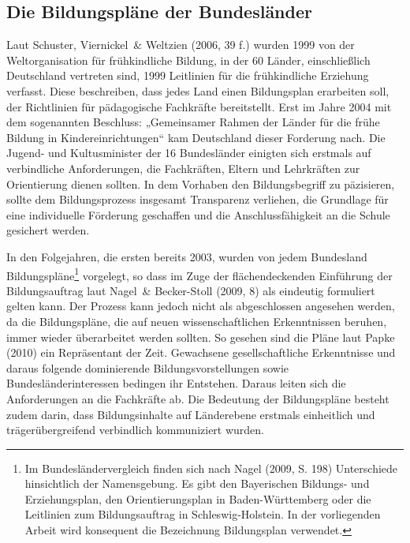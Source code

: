 \subsection{Die Bildungspläne der Bundesländer}
Laut Schuster, Viernickel~\& Weltzien (2006, 39 f.) wurden 1999 von der Weltorganisation für frühkindliche Bildung, in der 60 Länder, einschließlich Deutschland vertreten sind, 1999 Leitlinien für die frühkindliche Erziehung verfasst. Diese beschreiben, dass jedes Land einen Bildungsplan erarbeiten soll, der Richtlinien für pädagogische Fachkräfte bereitstellt. Erst im Jahre 2004 mit dem sogenannten Beschluss: „Gemeinsamer Rahmen der Länder für die frühe Bildung in Kindereinrichtungen“ kam Deutschland dieser Forderung nach. Die Jugend- und Kultusminister der 16 Bundesländer einigten sich erstmals auf verbindliche Anforderungen, die Fachkräften, Eltern und Lehrkräften zur Orientierung dienen sollten. In dem Vorhaben den Bildungsbegriff zu päzisieren, sollte dem Bildungsprozess insgesamt Transparenz verliehen, die Grundlage für eine individuelle Förderung geschaffen und die Anschlussfähigkeit an die Schule gesichert werden. 

In den Folgejahren, die ersten bereits 2003, wurden von jedem Bundesland Bildungspläne\footnote{Im Bundesländervergleich finden sich nach Nagel (2009, S. 198) Unterschiede hinsichtlich der Namensgebung. Es gibt den Bayerischen Bildungs- und Erziehungsplan, den Orientierungsplan in Baden-Württemberg oder die Leitlinien zum Bildungsauftrag in Schleswig-Holstein. In der vorliegenden Arbeit wird konsequent die Bezeichnung Bildungsplan verwendet.} vorgelegt, so dass im Zuge der flächendeckenden Einführung der Bildungsauftrag laut Nagel~\& Becker-Stoll (2009, 8) als eindeutig formuliert gelten kann. Der Prozess kann jedoch nicht als abgeschlossen angesehen werden, da die Bildungspläne, die auf neuen wissenschaftlichen Erkenntnissen beruhen, immer wieder überarbeitet werden sollten. So gesehen sind die Pläne laut Papke (2010) ein Repräsentant der Zeit. Gewachsene gesellschaftliche Erkenntnisse und daraus folgende dominierende Bildungsvorstellungen sowie Bundesländerinteressen bedingen ihr Entstehen. Daraus leiten sich die Anforderungen an die Fachkräfte ab. Die Bedeutung der Bildungspläne besteht zudem darin, dass Bildungsinhalte auf Länderebene erstmals einheitlich und trägerübergreifend verbindlich kommuniziert wurden. 

